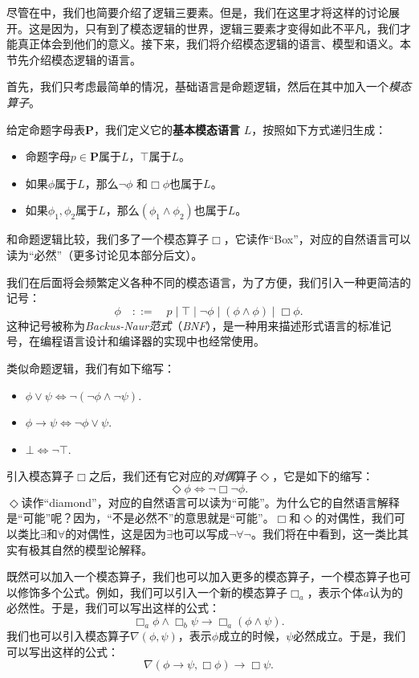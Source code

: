 尽管在中，我们也简要介绍了逻辑三要素。但是，我们在这里才将这样的讨论展开。这是因为，只有到了模态逻辑的世界，逻辑三要素才变得如此不平凡，我们才能真正体会到他们的意义。接下来，我们将介绍模态逻辑的语言、模型和语义。本节先介绍模态逻辑的语言。

首先，我们只考虑最简单的情况，基础语言是命题逻辑，然后在其中加入一个\emph{模态算子}。

\begin{definition}[基本模态语言]
给定命题字母表$\mathbf P$，我们定义它的\textbf{基本模态语言} $L$，按照如下方式递归生成：
\begin{itemize}
    \item 命题字母$p\in \mathbf P$属于$L$，$\top$属于$L$。
    \item 如果$\phi$属于$L$，那么$\neg\phi$ 和$\Box\phi$也属于$L$。
    \item 如果$\phi_1,\phi_2$属于$L$，那么$(\phi_1\wedge\phi_2)$也属于$L$。
\end{itemize}
\end{definition}

和命题逻辑比较，我们多了一个模态算子$\Box$，它读作“Box”，对应的自然语言可以读为“必然”（更多讨论见本部分后文）。

我们在后面将会频繁定义各种不同的模态语言，为了方便，我们引入一种更简洁的记号：
\[\phi\quad::=\quad p\mid \top\mid \neg\phi\mid (\phi\wedge\phi)\mid \Box\phi.\]
这种记号被称为\emph{Backus-Naur范式}（\emph{BNF}），是一种用来描述形式语言的标准记号，在编程语言设计和编译器的实现中也经常使用。

类似命题逻辑，我们有如下缩写：
\begin{itemize}
    \item $\phi\vee\psi\iff\neg(\neg \phi\wedge\neg\psi)$.
    \item $\phi\to\psi\iff\neg\phi\vee\psi$.
    \item $\bot\iff\neg\top$.
\end{itemize}

引入模态算子$\Box$之后，我们还有它对应的\emph{对偶}算子$\Diamond$，它是如下的缩写：
\[\Diamond\phi\iff\neg\Box\neg\phi.\]
$\Diamond$读作“diamond”，对应的自然语言可以读为“可能”。为什么它的自然语言解释是“可能”呢？因为，“不是必然不”的意思就是“可能”。$\Box$和$\Diamond$的对偶性，我们可以类比$\exists$和$\forall$的对偶性，这是因为$\exists$也可以写成$\neg\forall\neg$。我们将在中看到，这一类比其实有极其自然的模型论解释。

既然可以加入一个模态算子，我们也可以加入更多的模态算子，一个模态算子也可以修饰多个公式。例如，我们可以引入一个新的模态算子$\Box_a$，表示个体$a$认为的必然性。于是，我们可以写出这样的公式：
\[\Box_a\phi\wedge\Box_b\psi\to\Box_a(\phi\wedge\psi).\]
我们也可以引入模态算子$\nabla(\phi,\psi)$，表示$\phi$成立的时候，$\psi$必然成立。于是，我们可以写出这样的公式：
\[\nabla(\phi\to\psi,\Box\phi)\to\Box\psi.\]

